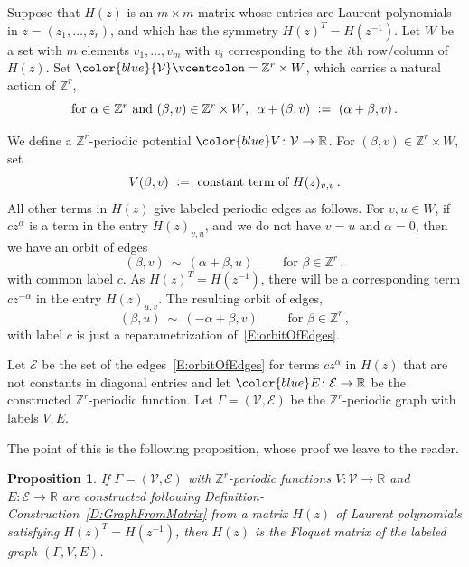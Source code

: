 \documentclass[12pt]{amsart}
\newtheorem{Proposition}[Theorem]{Proposition}
\theoremstyle{remark}
\newenvironment{DefConstr}
{\pushQED{\qed}\renewcommand{\qedsymbol}{$\diamond$}\defConstr}
{\popQED\enddefConstr}
\newcommand{\RR}{{\mathbb R}}
\newcommand{\ZZ}{{\mathbb Z}}
\newcommand{\calE}{{\mathcal E}}
\newcommand{\calV}{{\mathcal V}}
\newcommand{\defcolor}[1]{{\color{blue}#1}}
\begin{document}
\begin{DefConstr}\label{D:GraphFromMatrix}
  Suppose that $H(z)$ is an $m\times m$ matrix whose entries are Laurent polynomials in $z=(z_1,\dotsc,z_r)$, and which 
  has the symmetry $H(z)^T=H(z^{-1})$.
  Let \defcolor{$W$} be a set with $m$ elements $v_1,\dotsc,v_m$ with $v_i$ corresponding to the $i$th row/column of $H(z)$.
  Set $\defcolor{\calV}\vcentcolon=\ZZ^r\times W$, which carries a natural action of $\ZZ^r$,
  \[
  \mbox{for $\alpha\in\ZZ^r$ and $(\beta,v)\in\ZZ^r\times W$, }\  \alpha+(\beta,v)\ \vcentcolon=\ (\alpha+\beta,v)\,.
  \]

  We define a $\ZZ^r$-periodic potential $\defcolor{V}\colon\calV\to\RR$.
  For $(\beta,v)\in \ZZ^r\times W$, set
  \[
  V(\beta,v)\ \vcentcolon=\ \mbox{constant term of $H(z)_{v,v}$}\,.
  \]
  All other terms in $H(z)$ give labeled periodic edges as follows.
  For $v,u\in W$, if $cz^\alpha$ is a term in the entry $H(z)_{v,u}$, and we do not have $v=u$ and $\alpha=0$, 
  then we have an orbit of edges
  \begin{equation}\label{E:orbitOfEdges}
    (\beta,v)\ \sim\ (\alpha+\beta,u) \qquad \mbox{ for } \beta\in\ZZ^r\,,
  \end{equation}
  with common label $c$.
  As $H(z)^T=H(z^{-1})$, there will be a corresponding term $cz^{-\alpha}$ in the entry $H(z)_{u,v}$.
  The resulting orbit of edges,
  \[
     (\beta,u)\ \sim\ (-\alpha+\beta,v) \qquad \mbox{ for } \beta\in\ZZ^r\,,
  \]
  with label $c$ is just a reparametrization of~\eqref{E:orbitOfEdges}.

  Let \defcolor{$\calE$} be the set of the edges~\eqref{E:orbitOfEdges} for terms $cz^\alpha$ in $H(z)$ that are
  not constants in diagonal entries and let $\defcolor{E}\colon\calE\to\RR$ be the constructed $\ZZ^r$-periodic function.
  Let $\Gamma=(\calV,\calE)$ be the $\ZZ^r$-periodic graph with labels $V,E$.
 \end{DefConstr}

The point of this is the following proposition, whose proof we leave to the reader.

\begin{Proposition}\label{P:GraphFromFloquet}
  If $\Gamma=(\calV,\calE)$ with $\ZZ^r$-periodic functions $V\colon\calV\to\RR$ and $E\colon\calE\to\RR$ are
  constructed following Definition-Construction~\ref{D:GraphFromMatrix} from a matrix $H(z)$ of Laurent polynomials
  satisfying $H(z)^T=H(z^{-1})$, then $H(z)$ is the Floquet matrix of the labeled graph $(\Gamma,V,E)$.
\end{Proposition}
\end{document}
